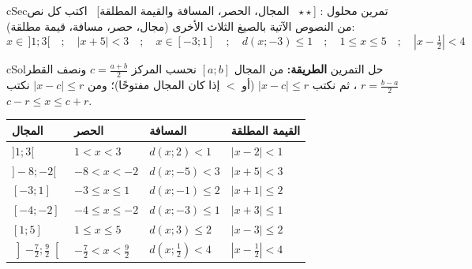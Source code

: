 \documentclass[12pt,a4paper]{article}
\newenvironment{BOX}[2]{\begin{otherlanguage}{english}\begin{arbox}{#1}{#2}}{\end{arbox}\end{otherlanguage}}
\newcounter{exo}
\newenvironment{hal}{\Needspace{12\baselineskip}\begin{otherlanguage}{english}\begin{arbox}[breakable]{cSol}{حل التمرين \theexo}}{\end{arbox}\end{otherlanguage}}
\newenvironment{tmr}{\stepcounter{exo}\begin{BOX}{cSec}{تمرين محلول \theexo}}{\end{BOX}}
\renewenvironment{tmr}[1][]{\stepcounter{exo}\begin{BOX}{cSec}{تمرين محلول \theexo: #1}}{\end{BOX}}
\let\origNeedspace\Needspace
\renewcommand{\Needspace}[1]{\origNeedspace{14\baselineskip}}
\begin{document}
\begin{tmr}
[$\star\star$ \ المجال، الحصر، المسافة والقيمة المطلقة] \ اكتب كل نص من النصوص الآتية بالصيغ الثلاث الأخرى (مجال، حصر، مسافة، قيمة مطلقة):
\[ x\in\,]1;3[\quad;\quad |x+5|<3\quad;\quad x\in[-3;1]\quad;\quad d(x;-3)\leqslant1\quad;\quad 1\leqslant x\leqslant5\quad;\quad \left|x-\tfrac{1}{2}\right|<4 \]
\end{tmr}
\begin{hal}
\textbf{الطريقة:} من المجال $[a;b]$ نحسب المركز $c=\frac{a+b}{2}$ ونصف القطر $r=\frac{b-a}{2}$ ، ثم نكتب $|x-c|\leqslant r$ (أو $<$ إذا كان المجال مفتوحًا)؛ ومن $|x-c|\leqslant r$ نكتب $c-r\leqslant x\leqslant c+r$.
\begin{center}
\renewcommand{\arraystretch}{1.5}
\begin{tabular}{|>{\centering\arraybackslash}p{}|>{\centering\arraybackslash}p{}|>{\centering\arraybackslash}p{}|>{\centering\arraybackslash}p{}|}\hline
\rowcolor{cSec!12}\textbf{المجال} & \textbf{الحصر} & \textbf{المسافة} & \textbf{القيمة المطلقة}\\\hline
$]1;3[$ & $1<x<3$ & $d(x;2)<1$ & $|x-2|<1$\\\hline
$]-8;-2[$ & $-8<x<-2$ & $d(x;-5)<3$ & $|x+5|<3$\\\hline
$[-3;1]$ & $-3\leqslant x\leqslant1$ & $d(x;-1)\leqslant2$ & $|x+1|\leqslant2$\\\hline
$[-4;-2]$ & $-4\leqslant x\leqslant-2$ & $d(x;-3)\leqslant1$ & $|x+3|\leqslant1$\\\hline
$[1;5]$ & $1\leqslant x\leqslant5$ & $d(x;3)\leqslant2$ & $|x-3|\leqslant2$\\\hline
$\left]-\frac{7}{2};\frac{9}{2}\right[$ & $-\frac{7}{2}<x<\frac{9}{2}$ & $d\left(x;\frac{1}{2}\right)<4$ & $\left|x-\frac{1}{2}\right|<4$\\\hline
\end{tabular}
\end{center}
\end{hal}
\end{document}
